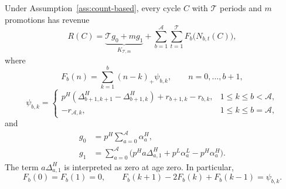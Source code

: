 \begin{proposition}
\label{thm:exposure-decomposition}
Under Assumption~\ref{ass:count-based}, every cycle \(C\) with \(\mathcal T\) periods and \(m\) promotions has revenue
\[
 R(C)=\underbrace{\mathcal T g_0+mg_1}_{K_{\mathcal T,m}}
       +\sum_{b=1}^{\mathcal A}\sum_{t=1}^{\mathcal T}
          F_b\bigl(N_{b,t}(C)\bigr),
\]
where
\[
 F_b(n)=\sum_{k=1}^{b}(n-k)_+\psi_{b,k},
 \qquad n=0,\ldots,b+1,
\]
\[
 \psi_{b,k}=
 \begin{cases}
 p^H(\Delta_{b+1,k+1}^H-\Delta_{b+1,k}^H)+r_{b+1,k}-r_{b,k},
       &1\le k\le b<\mathcal A,\\
 -r_{\mathcal A,k},&1\le k\le b=\mathcal A,
 \end{cases}
\]
and
\[
\begin{aligned}
 g_0&=p^H\sum_{a=0}^{\mathcal A}\alpha_a^H,\\
 g_1&=\sum_{a=0}^{\mathcal A}
       \bigl(p^Ha \Delta_{a,1}^H+p^L\alpha_a^L-p^H\alpha_a^H\bigr).
\end{aligned}
\]
The term \(a\Delta_{a,1}^H\) is interpreted as zero at age zero. In particular,
\[
 F_b(0)=F_b(1)=0,\qquad
 F_b(k+1)-2F_b(k)+F_b(k-1)=\psi_{b,k}.
\]
\end{proposition}

